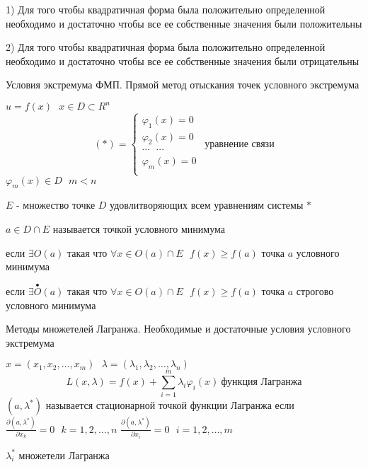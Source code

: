 \begin{block}
  1) Для того чтобы квадратичная форма была положительно определенной
  необходимо и достаточно чтобы все ее собственные значения были положительны

  2) Для того чтобы квадратичная форма была положительно определенной
  необходимо и достаточно чтобы все ее собственные значения были отрицательны
\end{block}

\begin{title}[\Large]
  Условия экстремума ФМП. Прямой метод отыскания точек условного экстремума
\end{title}

\begin{define}
  $u = f(x) ~~~ x \in D \subset R^n$
  $$
  (*) =
  \left\{
  \begin{array}{c}
    \varphi_1(x) = 0 \\
    \varphi_2(x) = 0 \\
    \cdots ~~~ \cdots \\
    \varphi_m(x) = 0 \\
  \end{array}
  \right. ~~ \text{уравнение связи}
  $$
  $\varphi_m(x) \in D ~~~ m < n$

  $E$ - множество точке $D$ удовлитворяющих всем уравнениям системы $*$

  $a \in D \cap E$ называется точкой условного минимума

  если $\exists O(a)$ такая что $\forall x \in O(a) \cap E ~~~ f(x) \ge f(a)$
  точка $a$ условного минимума

  если $\exists \stackrel{\bullet}{O}(a)$ такая что $\forall x \in O(a) \cap E
  ~~~ f(x) \ge f(a)$ точка $a$ строгово условного минимума
\end{define}

\begin{title}[\Large]
  Методы множетелей Лагранжа. Необходимые и достаточные условия условного
  экстремума
\end{title}

\begin{define}
  $x = (x_1, x_2, \ldots, x_m) ~~~ \lambda = (\lambda_1, \lambda_2, \ldots,
  \lambda_n)$
  $$
  L(x, \lambda) = f(x) + \sum_{i=1}^m \lambda_i \varphi_i(x) ~ \text{
  функция Лагранжа}
  $$
  $(a, \lambda^*)$ называется стационарной точкой функции Лагранжа если
  $\frac{\partial (a, \lambda^*)}{\partial x_k} = 0 ~~~ k = 1,2, \ldots, n$
  $\frac{\partial (a, \lambda^*)}{\partial x_i} = 0 ~~~ i = 1,2, \ldots, m$

  $\lambda_i^*$ множетели Лагранжа
\end{define}

